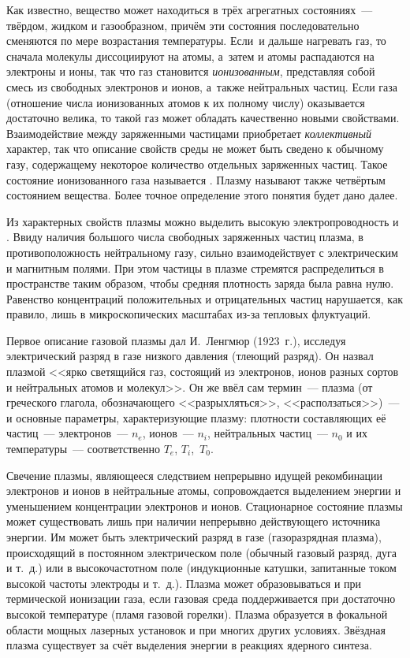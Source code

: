 
Как известно, вещество может находиться в трёх агрегатных состояниях~--- твёрдом,
жидком и газообразном, причём эти
состояния последовательно сменяются по мере возрастания температуры. Если~и
дальше нагревать газ, то сначала молекулы диссоциируют на атомы, а~затем и атомы
распадаются на электроны и ионы, так что газ становится \emph{ионизованным},
представляя собой смесь из свободных электронов и ионов, а~также нейтральных
частиц. Если  газа
(отношение числа ионизованных атомов к их полному числу) оказывается достаточно велика, то
такой газ может обладать качественно новыми свойствами.
Взаимодействие между заряженными частицами приобретает \emph{коллективный} характер,
так что описание свойств среды не может быть сведено к обычному газу,
содержащему некоторое количество отдельных заряженных частиц.
Такое состояние ионизованного газа называется .
Плазму называют также четвёртым состоянием вещества.
Более точное определение этого понятия будет дано далее.

Из характерных свойств плазмы можно выделить высокую электропроводность и
. Ввиду наличия большого числа свободных
заряженных частиц плазма, в противоположность нейтральному газу, сильно
взаимодействует с электрическим и магнитным полями.
При этом частицы в плазме стремятся распределиться в пространстве таким образом,
чтобы средняя плотность заряда была равна нулю. Равенство концентраций
положительных и отрицательных частиц нарушается, как правило,
лишь в микроскопических масштабах из-за тепловых флуктуаций.

Первое описание газовой плазмы дал И.~Ленгмюр (1923~г.), исследуя электрический
разряд в газе низкого давления (тлеющий разряд). Он назвал плазмой <<ярко
светящийся газ, состоящий из электронов, ионов разных сортов и нейтральных
атомов и молекул>>. Он же ввёл сам термин~--- плазма (от греческого глагола,
обозначающего <<разрыхляться>>, <<расползаться>>)~--- и основные параметры,
характеризующие плазму: плотности составляющих её частиц~--- электронов~---
$n_e$, ионов~--- $n_i$, нейтральных частиц~--- $n_0$ и их температуры~---
соответственно $T_e$, $T_i$,~$T_0$.

Свечение плазмы, являющееся следствием непрерывно идущей
рекомбинации электронов и ионов в нейтральные атомы, сопровождается выделением
энергии и уменьшением концентрации электронов и ионов. Стационарное состояние
плазмы может существовать лишь при наличии непрерывно действующего источника
энергии. Им может быть электрический разряд в газе (газоразрядная плазма),
происходящий в постоянном электрическом поле (обычный газовый разряд,
дуга и т.~д.) или в высокочастотном поле (индукционные катушки,
запитанные током высокой частоты электроды и т.~д.).
Плазма может образовываться и при термической ионизации газа, если газовая среда
поддерживается при достаточно высокой температуре (пламя газовой
горелки). Плазма образуется в фокальной области мощных лазерных установок и при
многих других условиях. Звёздная плазма существует за счёт выделения энергии
в реакциях ядерного синтеза.

